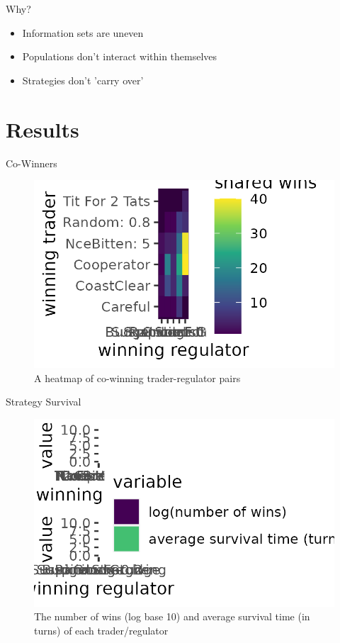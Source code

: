 \documentclass{beamer}
\begin{document}
\begin{frame}{Why?}
\begin{itemize}
    \item Information sets are uneven
    \item Populations don't interact within themselves
    \item Strategies don't 'carry over'
\end{itemize}
\end{frame}


\section{Results}
\begin{frame}{Co-Winners}
\begin{figure}[!h]
    \includegraphics[width=\textwidth]{heatmap.png}
    \caption{A heatmap of co-winning trader-regulator pairs}
    \label{fig:f1}
\end{figure}
\end{frame}

\begin{frame}{Strategy Survival}
\begin{figure}[!h]
    \includegraphics[width=\textwidth]{barplot.png}
    \caption{The number of wins (log base 10) and average survival time (in turns) of each trader/regulator}
    \label{fig:f2}
\end{figure}

\end{frame}
\end{document}
